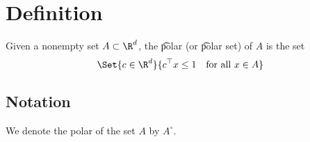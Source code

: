 
\section*{Definition}

Given a nonempty set $A \subset \R ^d$, the \t{polar} (or \t{polar set}) of $A$ is the set
\[
\Set{c \in \R ^d}{c^\top x \leq 1 \quad \text{for all } x \in A}
\]

\subsection*{Notation}

We denote the polar of the set $A$ by $A^\circ$.

\blankpage